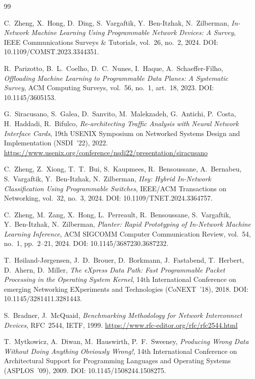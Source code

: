 \documentclass[11pt,a4paper,oneside]{report}
\begin{document}
\begin{thebibliography}{99}

C.~Zheng, X.~Hong, D.~Ding, S.~Vargaftik, Y.~Ben-Itzhak, N.~Zilberman,
\emph{In-Network Machine Learning Using Programmable Network Devices:
A Survey}, IEEE Communications Surveys \& Tutorials, vol.~26, no.~2,
2024. DOI: 10.1109/COMST.2023.3344351.

R.~Parizotto, B.~L.~Coelho, D.~C.~Nunes, I.~Haque, A.~Schaeffer-Filho,
\emph{Offloading Machine Learning to Programmable Data Planes: A
Systematic Survey}, ACM Computing Surveys, vol.~56, no.~1, art.~18,
2023. DOI: 10.1145/3605153.

G.~Siracusano, S.~Galea, D.~Sanvito, M.~Malekzadeh, G.~Antichi,
P.~Costa, H.~Haddadi, R.~Bifulco,
\emph{Re-architecting Traffic Analysis with Neural Network Interface
Cards}, 19th USENIX Symposium on Networked Systems Design and
Implementation (NSDI~'22), 2022.
\url{https://www.usenix.org/conference/nsdi22/presentation/siracusano}

C.~Zheng, Z.~Xiong, T.~T.~Bui, S.~Kaupmees, R.~Bensoussane,
A.~Bernabeu, S.~Vargaftik, Y.~Ben-Itzhak, N.~Zilberman,
\emph{IIsy: Hybrid In-Network Classification Using Programmable
Switches}, IEEE/ACM Transactions on Networking, vol.~32, no.~3, 2024.
DOI: 10.1109/TNET.2024.3364757.

C.~Zheng, M.~Zang, X.~Hong, L.~Perreault, R.~Bensoussane,
S.~Vargaftik, Y.~Ben-Itzhak, N.~Zilberman,
\emph{Planter: Rapid Prototyping of In-Network Machine Learning
Inference}, ACM SIGCOMM Computer Communication Review, vol.~54, no.~1,
pp.~2--21, 2024. DOI: 10.1145/3687230.3687232.

T.~Høiland-Jørgensen, J.~D.~Brouer, D.~Borkmann, J.~Fastabend,
T.~Herbert, D.~Ahern, D.~Miller,
\emph{The eXpress Data Path: Fast Programmable Packet Processing in
the Operating System Kernel}, 14th International Conference on
emerging Networking EXperiments and Technologies (CoNEXT~'18), 2018.
DOI: 10.1145/3281411.3281443.

S.~Bradner, J.~McQuaid,
\emph{Benchmarking Methodology for Network Interconnect Devices},
RFC~2544, IETF, 1999. \url{https://www.rfc-editor.org/rfc/rfc2544.html}

T.~Mytkowicz, A.~Diwan, M.~Hauswirth, P.~F.~Sweeney,
\emph{Producing Wrong Data Without Doing Anything Obviously Wrong!},
14th International Conference on Architectural Support for Programming
Languages and Operating Systems (ASPLOS~'09), 2009.
DOI: 10.1145/1508244.1508275.


\end{thebibliography}
\end{document}
